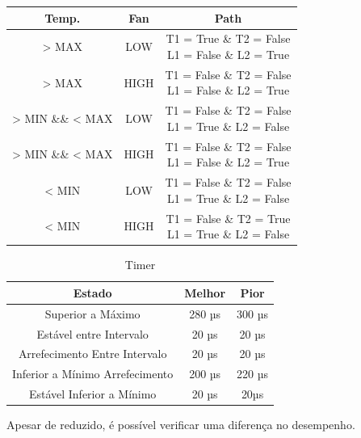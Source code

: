 \begin{table}[H]
    \centering
    \begin{tabular}{|c|c|c|}
        \hline
        \multicolumn{1}{|c|}{Temp.} & 
        \multicolumn{1}{|c|}{Fan} & 
        \multicolumn{1}{|c|}{Path}\\
        \hline
        > MAX & LOW & \makecell{T1 = True \& T2 = False\\ L1 = False \& L2 = True}\\
        \hline
        > MAX & HIGH & \makecell{T1 = False \& T2 = False \\ L1 = False \& L2 = True}\\
        \hline
        > MIN \&\& < MAX & LOW & \makecell{T1 = False \& T2 = False \\ L1 = True \& L2 = False}\\
        \hline
        > MIN \&\& < MAX & HIGH & \makecell{T1 = False \& T2 = False \\ L1 = False \& L2 = True}\\
        \hline
        < MIN & LOW & \makecell{T1 = False \& T2 = False \\ L1 = True \& L2 = False}\\
        \hline
        < MIN & HIGH & \makecell{T1 = False \& T2 = True \\ L1 = True \& L2 = False}\\
        \hline
    \end{tabular}
\end{table}

\newpage

\begin{table}[H]
    \centering
    \begin{tabular}{|c|c|c|}
        \hline
        \multicolumn{1}{|c|}{Estado} & \multicolumn{1}{|c|}{Melhor} & \multicolumn{1}{|c|}{Pior}\\ [0.8ex] 
        \hline
        Superior a Máximo               & 280 µs & 300 µs \\
        \hline
        Estável entre Intervalo         & 20 µs & 20 µs \\
        \hline
        Arrefecimento Entre Intervalo   & 20 µs & 20 µs \\
        \hline
        Inferior a Mínimo Arrefecimento & 200 µs & 220 µs \\
        \hline
        Estável Inferior a Mínimo       & 20 µs & 20µs \\
        \hline
    \end{tabular}
    \caption{Timer}
\end{table}

Apesar de reduzido, é possível verificar uma diferença no desempenho.